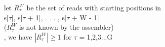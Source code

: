 \documentclass[preview]{standalone}
\begin{document}
\begin{center}
let $R^W_{\tau}$  be the set of reads with starting positions in\\ s[$\tau$], s[$\tau$ + 1], . . . , s[$\tau$ + W - 1] \\($R^W_{\tau}$ is not known by the assembler)\\, we have $|R^W_{\tau}| \ge 1$ for $\tau$ = 1,2,3...G
\end{center}
\end{document}
